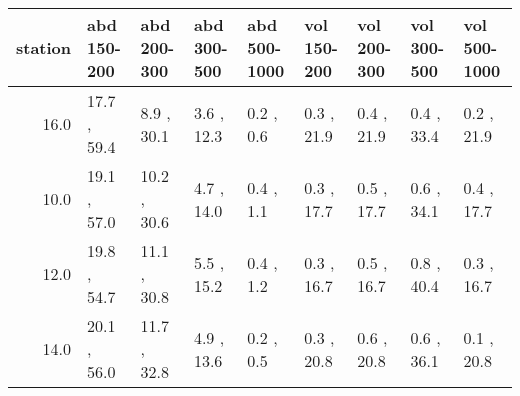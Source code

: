 \begin{tabular}{rllllllll}
\toprule
 station &  abd 150-200 &  abd 200-300 & abd 300-500 & abd 500-1000 & vol 150-200 & vol 200-300 & vol 300-500 & vol 500-1000 \\
\midrule
    16.0 &  17.7 , 59.4 &   8.9 , 30.1 &  3.6 , 12.3 &    0.2 , 0.6 &  0.3 , 21.9 &  0.4 , 21.9 &  0.4 , 33.4 &   0.2 , 21.9 \\
    10.0 &  19.1 , 57.0 &  10.2 , 30.6 &  4.7 , 14.0 &    0.4 , 1.1 &  0.3 , 17.7 &  0.5 , 17.7 &  0.6 , 34.1 &   0.4 , 17.7 \\
    12.0 &  19.8 , 54.7 &  11.1 , 30.8 &  5.5 , 15.2 &    0.4 , 1.2 &  0.3 , 16.7 &  0.5 , 16.7 &  0.8 , 40.4 &   0.3 , 16.7 \\
    14.0 &  20.1 , 56.0 &  11.7 , 32.8 &  4.9 , 13.6 &    0.2 , 0.5 &  0.3 , 20.8 &  0.6 , 20.8 &  0.6 , 36.1 &   0.1 , 20.8 \\
\bottomrule
\end{tabular}
